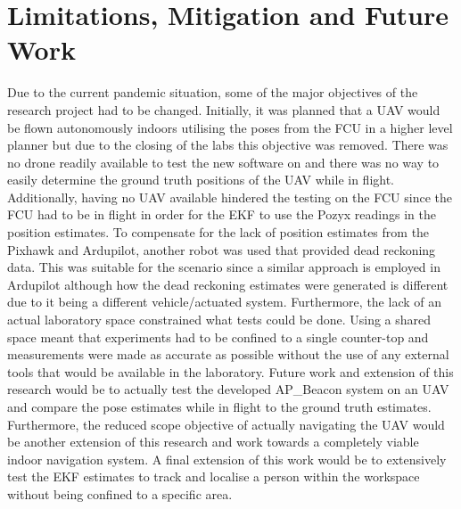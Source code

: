 \section{Limitations, Mitigation and Future Work}\label{sec:limitations,-mitigations-and-future-work}
Due to the current pandemic situation, some of the major objectives of the research project had to be changed.
Initially, it was planned that a UAV would be flown autonomously indoors utilising the poses from the FCU in a higher level planner but due to the closing of the labs this objective was removed.
There was no drone readily available to test the new software on and there was no way to easily determine the ground truth positions of the UAV while in flight.
Additionally, having no UAV available hindered the testing on the FCU since the FCU had to be in flight in order for the EKF to use the Pozyx readings in the position estimates.
To compensate for the lack of position estimates from the Pixhawk and Ardupilot, another robot was used that provided dead reckoning data.
This was suitable for the scenario since a similar approach is employed in Ardupilot although how the dead reckoning estimates were generated is different due to it being a different vehicle/actuated system.
Furthermore, the lack of an actual laboratory space constrained what tests could be done.
Using a shared space meant that experiments had to be confined to a single counter-top and measurements were made as accurate as possible without the use of any external tools that would be available in the laboratory.
Future work and extension of this research would be to actually test the developed AP\_Beacon system on an UAV and compare the pose estimates while in flight to the ground truth estimates.
Furthermore, the reduced scope objective of actually navigating the UAV would be another extension of this research and work towards a completely viable indoor navigation system.
A final extension of this work would be to extensively test the EKF estimates to track and localise a person within the workspace without being confined to a specific area.
